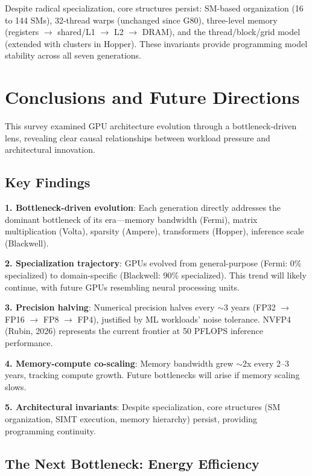 \documentclass{article}
\begin{document}
Despite radical specialization, core structures persist: SM-based organization (16 to 144 SMs), 32-thread warps (unchanged since G80), three-level memory (registers $\to$ shared/L1 $\to$ L2 $\to$ DRAM), and the thread/block/grid model (extended with clusters in Hopper). These invariants provide programming model stability across all seven generations.

\section{Conclusions and Future Directions}

This survey examined GPU architecture evolution through a bottleneck-driven lens, revealing clear causal relationships between workload pressure and architectural innovation.

\subsection{Key Findings}

\textbf{1. Bottleneck-driven evolution}: Each generation directly addresses the dominant bottleneck of its era---memory bandwidth (Fermi), matrix multiplication (Volta), sparsity (Ampere), transformers (Hopper), inference scale (Blackwell).

\textbf{2. Specialization trajectory}: GPUs evolved from general-purpose (Fermi: 0\% specialized) to domain-specific (Blackwell: 90\% specialized). This trend will likely continue, with future GPUs resembling neural processing units.

\textbf{3. Precision halving}: Numerical precision halves every $\sim$3 years (FP32 $\to$ FP16 $\to$ FP8 $\to$ FP4), justified by ML workloads' noise tolerance. NVFP4 (Rubin, 2026) represents the current frontier at 50 PFLOPS inference performance.

\textbf{4. Memory-compute co-scaling}: Memory bandwidth grew $\sim$2x every 2--3 years, tracking compute growth. Future bottlenecks will arise if memory scaling slows.

\textbf{5. Architectural invariants}: Despite specialization, core structures (SM organization, SIMT execution, memory hierarchy) persist, providing programming continuity.

\subsection{The Next Bottleneck: Energy Efficiency}
\end{document}
